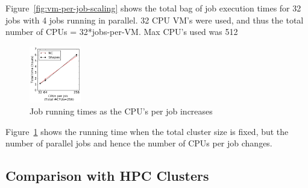 Figure~\ref{fig:vm-per-job-scaling} shows the total bag of job execution times for 32 jobs with 4 jobs running in parallel.
32 CPU VM's were used, and thus the total number of CPUs = 32*jobs-per-VM. Max CPU's used was 512 


\begin{figure}
  \includegraphics[width=0.2\textwidth]{../graphs/par-scaling.pdf}
  \caption{Job running times as the CPU's per job increases}
  \label{fig:par-scaling}
\end{figure}

Figure~\ref{fig:par-scaling} shows the running time when the total cluster size is fixed, but the number of parallel jobs and hence the number of CPUs per job changes. 



\subsection{Comparison with HPC Clusters}





